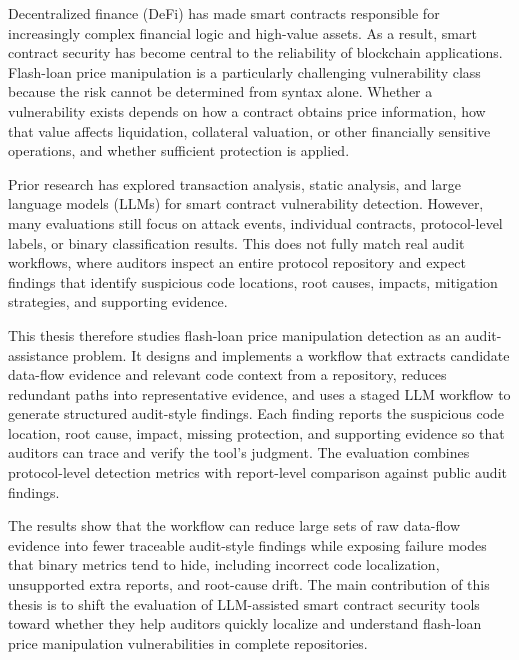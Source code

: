 \begin{abstract*}

Decentralized finance (DeFi) has made smart contracts responsible for increasingly complex financial logic and high-value assets. As a result, smart contract security has become central to the reliability of blockchain applications. Flash-loan price manipulation is a particularly challenging vulnerability class because the risk cannot be determined from syntax alone. Whether a vulnerability exists depends on how a contract obtains price information, how that value affects liquidation, collateral valuation, or other financially sensitive operations, and whether sufficient protection is applied.

Prior research has explored transaction analysis, static analysis, and large language models (LLMs) for smart contract vulnerability detection. However, many evaluations still focus on attack events, individual contracts, protocol-level labels, or binary classification results. This does not fully match real audit workflows, where auditors inspect an entire protocol repository and expect findings that identify suspicious code locations, root causes, impacts, mitigation strategies, and supporting evidence.

This thesis therefore studies flash-loan price manipulation detection as an audit-assistance problem. It designs and implements a workflow that extracts candidate data-flow evidence and relevant code context from a repository, reduces redundant paths into representative evidence, and uses a staged LLM workflow to generate structured audit-style findings. Each finding reports the suspicious code location, root cause, impact, missing protection, and supporting evidence so that auditors can trace and verify the tool's judgment. The evaluation combines protocol-level detection metrics with report-level comparison against public audit findings.

The results show that the workflow can reduce large sets of raw data-flow evidence into fewer traceable audit-style findings while exposing failure modes that binary metrics tend to hide, including incorrect code localization, unsupported extra reports, and root-cause drift. The main contribution of this thesis is to shift the evaluation of LLM-assisted smart contract security tools toward whether they help auditors quickly localize and understand flash-loan price manipulation vulnerabilities in complete repositories.

\end{abstract*}
